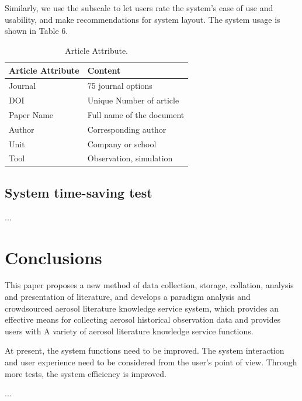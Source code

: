 Similarly, we use the subscale to let users rate the system's ease of use and usability, and make recommendations for system layout. The system usage is shown in Table 6.

\begin{table}
	\caption{Article Attribute.}
	\label{tab:freq}
	\begin{tabular}{ll}
		\toprule
		Article Attribute&Content\\
		\midrule
		Journal & 75 journal options\\
		DOI & Unique Number of article\\
		Paper Name & Full name of the document\\
		Author & Corresponding author\\
		Unit & Company or school\\
		Tool & Observation, simulation\\
		\bottomrule
	\end{tabular}
\end{table}

\subsection{System time-saving test}
...


\section{Conclusions}
This paper proposes a new method of data collection, storage, collation, analysis and presentation of literature, and develops a paradigm analysis and crowdsourced aerosol literature knowledge service system, which provides an effective means for collecting aerosol historical observation data and provides users with A variety of aerosol literature knowledge service functions.

At present, the system functions need to be improved. The system interaction and user experience need to be considered from the user's point of view. Through more tests, the system efficiency is improved.


\begin{acks}
...
	
\end{acks}
